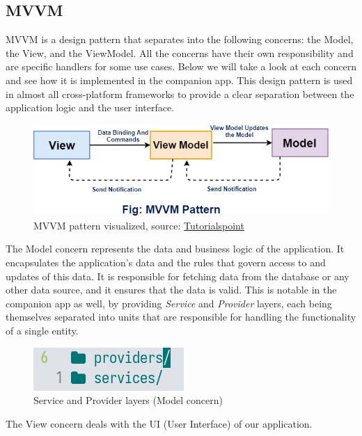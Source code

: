 \subsection{MVVM}
\par
MVVM is a design pattern that separates into the following concerns: the Model, the View, and the ViewModel. 
All the concerns have their own responsibility and are specific handlers for some use cases.
Below we will take a look at each concern and see how it is implemented in the companion app.
This design pattern is used in almost all cross-platform frameworks to provide a clear separation between the application logic and the user interface.
\begin{figure}[htbp]
    \centering
    \includegraphics[scale=0.7]{pictures/mvvm.png}
    \caption{MVVM pattern visualized, source: \href{https://www.javatpoint.com/xamarin-model-view-viewmodel-pattern}{Tutorialspoint}}
    \label{mvvmExample}
\end{figure}
\par
The Model concern represents the data and business logic of the application. 
It encapsulates the application's data and the rules that govern access to and updates of this data. 
It is responsible for fetching data from the database or any other data source, and it ensures that the data is valid. 
This is notable in the companion app as well, by providing \textit{Service} and \textit{Provider} layers, 
each being themselves separated into units that are responsible for handling the functionality of a single entity.
\begin{figure}[htbp]
    \centering
    \includegraphics[scale=1.0]{pictures/service_provider.png}
    \caption{Service and Provider layers (Model concern)}
    \label{serviceProviderExample}
\end{figure}
\par
The View concern deals with the UI (User Interface) of our application. 
